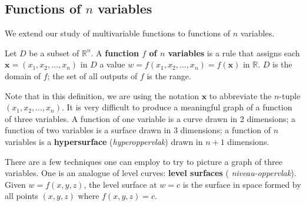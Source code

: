 \ifanalysis
\pagebreak
\subsection{Functions of $n$ variables}

We extend our study of multivariable functions to functions of $n$ variables. 

\begin{definition}\label{def:multi3}
Let $D$ be a subset of $\mathbb{R}^n$. A \textbf{function $f$ of $n$ variables} is a rule that assigns each $\mathbf{x}=(x_1,x_2,\ldots,x_n)$ in $D$ a value $w=f(x_1,x_2,\ldots,x_n)=f(\mathbf{x})$ in $\mathbb{R}$. $D$ is the domain of $f$; the set of all outputs of $f$ is the range.
\end{definition}

Note that in this definition, we are using the notation $\mathbf{x}$ to abbreviate the $n$-tuple $(x_1,x_2,\ldots,x_n)$. 
It is very difficult to produce a meaningful graph of a function of three variables. A function of one variable is a curve drawn in 2 dimensions; a function of two variables is a surface drawn in 3 dimensions; a function of $n$ variables is a \textbf{hypersurface} (\textit{hyperoppervlak}) drawn in $n+1$ dimensions.

\fi


There are a few techniques one can employ to try to picture a graph of three variables. One is an analogue of level curves: \textbf{level surfaces} (\textit{ niveau-oppervlak}). Given $w=f(x,y,z)$, the level surface at $w=c$ is the surface in space formed by all points $(x,y,z)$ where $f(x,y,z)=c$. 

